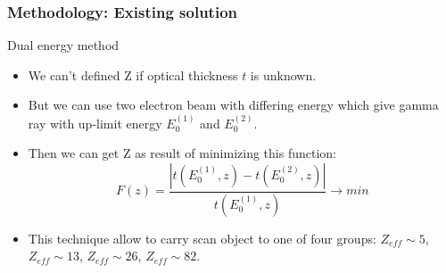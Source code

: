 \documentclass[11pt]{beamer}
\begin{document}
\begin{frame}
\begin{columns}
\begin{column}{0.4\textwidth}
        \end{column}
    \end{columns}  
\end{frame}

\begin{frame}
    \frametitle{Methodology: Existing solution}
    \begin{block}{Dual energy method}%
        \begin{itemize}
            \item We can't defined Z if optical thickness $t$ is unknown.
            \item But we can use two electron beam with differing energy which give gamma ray with up-limit energy $E^{(1)}_0$ and $E^{(2)}_0$.
            \item Then we can get Z as result of minimizing this function:
            $$
            F(z) = \frac{|t(E^{(1)}_0,z) - t(E^{(2)}_0,z)|}{t(E^{(1)}_0,z)} \to min
            $$
            \item This technique allow to carry scan object to one of four groups: $Z_{eff} \sim 5$, $Z_{eff} \sim 13$, $Z_{eff} \sim 26$, $Z_{eff} \sim 82$.
        \end{itemize}

    \end{block}

\end{frame}
\end{document}

